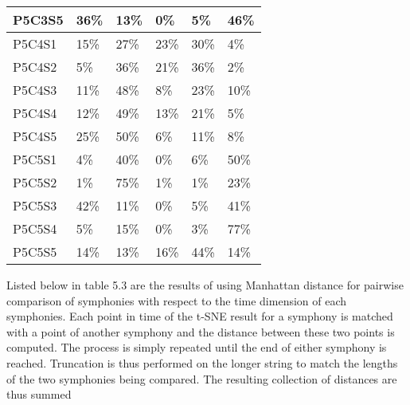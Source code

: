 \begin{longtable}{|l|l|l|l|l|l|}
P5C3S5 & 36\% & 13\% & 0\% & 5\% & 46\% \\ \hline
P5C4S1 & 15\% & 27\% & 23\% & 30\% & 4\% \\ \hline
P5C4S2 & 5\% & 36\% & 21\% & 36\% & 2\% \\ \hline
P5C4S3 & 11\% & 48\% & 8\% & 23\% & 10\% \\ \hline
P5C4S4 & 12\% & 49\% & 13\% & 21\% & 5\% \\ \hline
P5C4S5 & 25\% & 50\% & 6\% & 11\% & 8\% \\ \hline
P5C5S1 & 4\% & 40\% & 0\% & 6\% & 50\% \\ \hline
P5C5S2 & 1\% & 75\% & 1\% & 1\% & 23\% \\ \hline
P5C5S3 & 42\% & 11\% & 0\% & 5\% & 41\% \\ \hline
P5C5S4 & 5\% & 15\% & 0\% & 3\% & 77\% \\ \hline
P5C5S5 & 14\% & 13\% & 16\% & 44\% & 14\% \\ \hline
\end{longtable}

Listed below in table 5.3 are the results of using Manhattan distance for pairwise comparison of symphonies with respect to the time dimension of each symphonies. Each point in time of the t-SNE result for a symphony is matched with a point of another symphony and the distance between these two points is computed. The process is simply repeated until the end of either symphony is reached. Truncation is thus performed on the longer string to match the lengths of the two symphonies being compared. The resulting collection of distances are thus summed 

